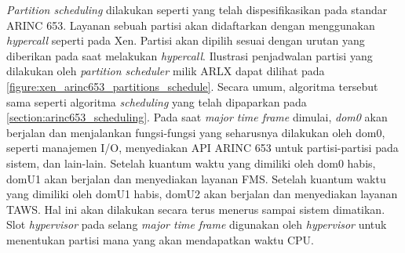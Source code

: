\textit{Partition scheduling} dilakukan seperti yang telah dispesifikasikan pada standar ARINC
653. Layanan sebuah partisi akan didaftarkan dengan menggunakan \textit{hypercall} seperti pada
Xen. Partisi akan dipilih sesuai dengan urutan yang diberikan pada saat melakukan
\textit{hypercall}.  Ilustrasi penjadwalan partisi yang dilakukan oleh \textit{partition
scheduler} milik ARLX dapat dilihat pada \autoref{figure:xen_arinc653_partitions_schedule}.
Secara umum, algoritma tersebut sama seperti algoritma \textit{scheduling} yang telah dipaparkan
pada \autoref{section:arinc653_scheduling}. Pada saat \textit{major time frame} dimulai,
\textit{dom0} akan berjalan dan menjalankan fungsi-fungsi yang seharusnya dilakukan oleh dom0,
seperti manajemen I/O, menyediakan API ARINC 653 untuk partisi-partisi pada sistem, dan
lain-lain. Setelah kuantum waktu yang dimiliki oleh dom0 habis, domU1 akan berjalan dan
menyediakan layanan FMS. Setelah  kuantum waktu yang dimiliki oleh domU1 habis, domU2 akan
berjalan dan menyediakan layanan TAWS. Hal ini akan dilakukan secara terus menerus sampai sistem
dimatikan. Slot \textit{hypervisor} pada selang \textit{major time frame} digunakan oleh
\textit{hypervisor} untuk menentukan partisi mana yang akan mendapatkan waktu CPU.


